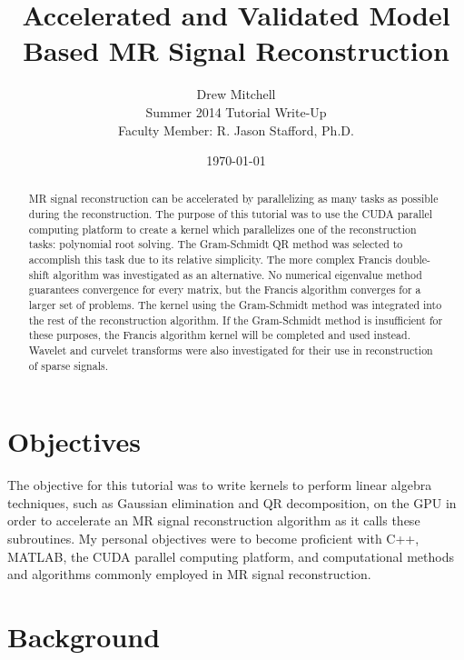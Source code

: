 \documentclass{article}
\begin{document}
\title{Accelerated and Validated Model Based MR Signal Reconstruction}
\author{Drew Mitchell\\
	Summer 2014 Tutorial Write-Up\\
	Faculty Member: R. Jason Stafford, Ph.D.}
\date{\today}
\maketitle

\begin{abstract}

MR signal reconstruction can be accelerated by parallelizing as many tasks as possible during the reconstruction. The purpose of this tutorial was to use the CUDA parallel computing platform to create a kernel which parallelizes one of the reconstruction tasks: polynomial root solving. The Gram-Schmidt QR method was selected to accomplish this task due to its relative simplicity. The more complex Francis double-shift algorithm was investigated as an alternative. No numerical eigenvalue method guarantees convergence for every matrix, but the Francis algorithm converges for a larger set of problems. The kernel using the Gram-Schmidt method was integrated into the rest of the reconstruction algorithm. If the Gram-Schmidt method is insufficient for these purposes, the Francis algorithm kernel will be completed and used instead. Wavelet and curvelet transforms were also investigated for their use in reconstruction of sparse signals.

\end{abstract}

\section*{Objectives}

The objective for this tutorial was to write kernels to perform linear algebra techniques, such as Gaussian elimination and QR decomposition, on the GPU in order to accelerate an MR signal reconstruction algorithm as it calls these subroutines. My personal objectives were to become proficient with C++, MATLAB, the CUDA parallel computing platform, and computational methods and algorithms commonly employed in MR signal reconstruction.

\section*{Background}
\end{document}
